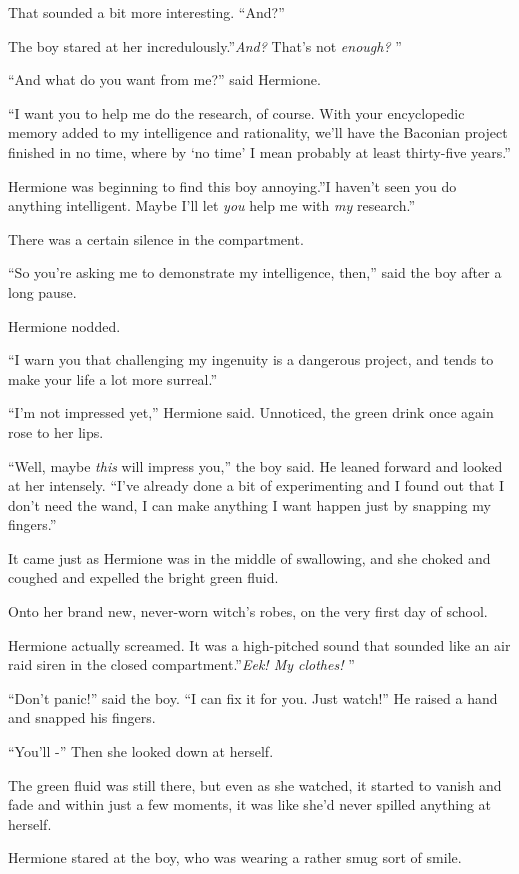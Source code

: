 That sounded a bit more interesting. ``And?''

The boy stared at her incredulously.''\emph{And?} That's not
\emph{enough?} ''

``And what do you want from me?'' said Hermione.

``I want you to help me do the research, of course. With your
encyclopedic memory added to my intelligence and rationality, we'll have
the Baconian project finished in no time, where by `no time' I mean
probably at least thirty-five years.''

Hermione was beginning to find this boy annoying.''I haven't seen you do
anything intelligent. Maybe I'll let \emph{you} help me with \emph{my}
research.''

There was a certain silence in the compartment.

``So you're asking me to demonstrate my intelligence, then,'' said the
boy after a long pause.

Hermione nodded.

``I warn you that challenging my ingenuity is a dangerous project, and
tends to make your life a lot more surreal.''

``I'm not impressed yet,'' Hermione said. Unnoticed, the green drink
once again rose to her lips.

``Well, maybe \emph{this} will impress you,'' the boy said. He leaned
forward and looked at her intensely. ``I've already done a bit of
experimenting and I found out that I don't need the wand, I can make
anything I want happen just by snapping my fingers.''

It came just as Hermione was in the middle of swallowing, and she choked
and coughed and expelled the bright green fluid.

Onto her brand new, never-worn witch's robes, on the very first day of
school.

Hermione actually screamed. It was a high-pitched sound that sounded
like an air raid siren in the closed compartment.''\emph{Eek! My
clothes!} ''

``Don't panic!'' said the boy. ``I can fix it for you. Just watch!'' He
raised a hand and snapped his fingers.

``You'll -'' Then she looked down at herself.

The green fluid was still there, but even as she watched, it started to
vanish and fade and within just a few moments, it was like she'd never
spilled anything at herself.

Hermione stared at the boy, who was wearing a rather smug sort of smile.

